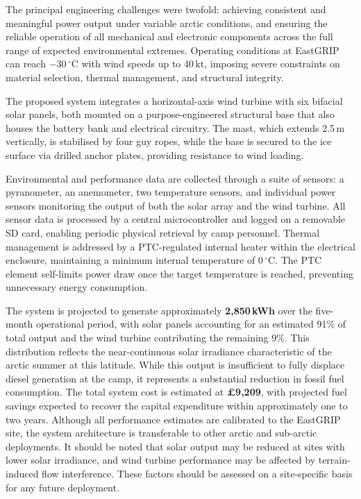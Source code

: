 \documentclass[11pt,a4paper]{article}
\begin{document}
The principal engineering challenges were twofold: achieving consistent and meaningful power output under variable arctic conditions, and ensuring the reliable operation of all mechanical and electronic components across the full range of expected environmental extremes. Operating conditions at EastGRIP can reach \(-30\,^{\circ}\mathrm{C}\) with wind speeds up to 40\,kt, imposing severe constraints on material selection, thermal management, and structural integrity.

The proposed system integrates a horizontal-axis wind turbine with six bifacial solar panels, both mounted on a purpose-engineered structural base that also houses the battery bank and electrical circuitry. The mast, which extends 2.5\,m vertically, is stabilised by four guy ropes, while the base is secured to the ice surface via drilled anchor plates, providing resistance to wind loading.

Environmental and performance data are collected through a suite of sensors: a pyranometer, an anemometer, two temperature sensors, and individual power sensors monitoring the output of both the solar array and the wind turbine. All sensor data is processed by a central microcontroller and logged on a removable SD card, enabling periodic physical retrieval by camp personnel.
Thermal management is addressed by a PTC-regulated internal heater within the electrical enclosure, maintaining a minimum internal temperature of \(0\,^{\circ}\mathrm{C}\). The PTC element self-limits power draw once the target temperature is reached, preventing unnecessary energy consumption.

The system is projected to generate approximately \textbf{2{,}850\,kWh} over the five-month operational period, with solar panels accounting for an estimated 91\% of total output and the wind turbine contributing the remaining 9\%. This distribution reflects the near-continuous solar irradiance characteristic of the arctic summer at this latitude.
While this output is insufficient to fully displace diesel generation at the camp, it represents a substantial reduction in fossil fuel consumption. The total system cost is estimated at \textbf{£9{,}209}, with projected fuel savings expected to recover the capital expenditure within approximately one to two years.
Although all performance estimates are calibrated to the EastGRIP site, the system architecture is transferable to other arctic and sub-arctic deployments. It should be noted that solar output may be reduced at sites with lower solar irradiance, and wind turbine performance may be affected by terrain-induced flow interference. These factors should be assessed on a site-specific basis for any future deployment.
\end{document}
